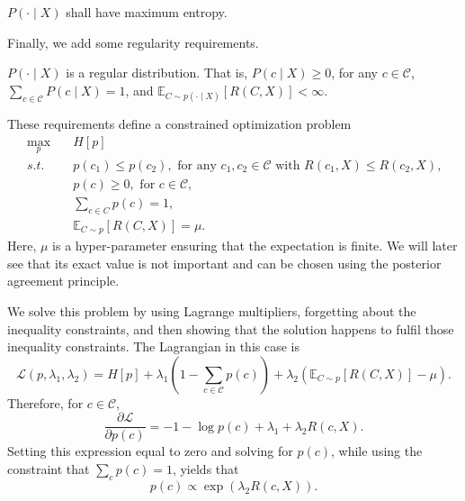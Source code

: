 \begin{requirement}
$P(\cdot \mid X)$ shall have maximum entropy.
\end{requirement}

Finally, we add some regularity requirements.

\begin{requirement}
$P(\cdot \mid X)$ is a regular distribution. That is, $P(c \mid X) \geq 0$, for any $c \in \mathcal{C}$, $\sum_{c \in \mathcal{C}} P(c \mid X) = 1$, and $\mathbb{E}_{C \sim p(\cdot \mid X)}[R(C, X)] < \infty$.
\end{requirement}

These requirements define a constrained optimization problem
%
\begin{align}
\max_{p} \quad& H[p]\label{eq:max_ent_gibbs}\\
s.t. \quad& p(c_1) \leq p(c_2), \text{ for any $c_1, c_2 \in \mathcal{C}$ with $R(c_1, X) \leq R(c_2, X)$,}\label{req:max_ent_mono}\\
& p(c) \geq 0, \text{ for $c \in \mathcal{C}$,}\label{req:max_ent_nonneg}\\
& \sum_{c \in C} p(c) = 1, \label{req:max_ent_massone}\\
& \mathbb{E}_{C \sim p}[R(C, X)] = \mu. \label{req:max_ent_fixexp}
\end{align}
%
Here, $\mu$ is a hyper-parameter ensuring that the expectation is finite. We will later see that its exact value is not important and can be chosen using the posterior agreement principle.

We solve this problem by using Lagrange multipliers, forgetting about the inequality constraints, and then showing that the solution happens to fulfil those inequality constraints. The Lagrangian in this case is
%
\begin{equation}
\mathcal{L}(p, \lambda_1, \lambda_2) = H[p] + \lambda_1 \left( 1- \sum_{c \in \mathcal{C}} p(c)\right) + \lambda_2 \left(\mathbb{E}_{C \sim p}[R(C, X)] - \mu\right).
\label{eq:max_ent_lag}
\end{equation}
%
Therefore, for $c \in \mathcal{C}$,
%
\begin{equation}
\frac{\partial \mathcal{L}}{\partial p(c)} = -1 -\log p(c) + \lambda_1 + \lambda_2 R(c, X).
\end{equation}
%
Setting this expression equal to zero and solving for $p(c)$, while using the constraint that $\sum_c p(c) = 1$, yields that
%
\begin{equation}
p(c) \propto \exp(\lambda_2 R(c, X)).
\end{equation}

